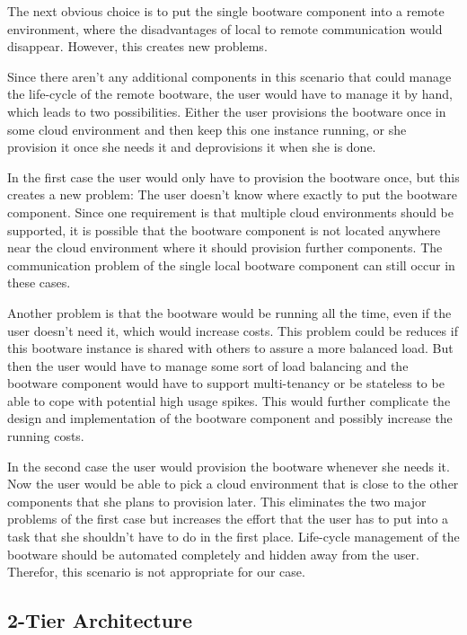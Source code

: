The next obvious choice is to put the single bootware component into a remote environment, where the disadvantages of local to remote communication would disappear.
However, this creates new problems.

Since there aren't any additional components in this scenario that could manage the life-cycle of the remote bootware, the user would have to manage it by hand, which leads to two possibilities.
Either the user provisions the bootware once in some cloud environment and then keep this one instance running, or she provision it once she needs it and deprovisions it when she is done.

In the first case the user would only have to provision the bootware once, but this creates a new problem: The user doesn't know where exactly to put the bootware component.
Since one requirement is that multiple cloud environments should be supported, it is possible that the bootware component is not located anywhere near the cloud environment where it should provision further components.
The communication problem of the single local bootware component can still occur in these cases.

Another problem is that the bootware would be running all the time, even if the user doesn't need it, which would increase costs.
This problem could be reduces if this bootware instance is shared with others to assure a more balanced load.
But then the user would have to manage some sort of load balancing and the bootware component would have to support multi-tenancy or be stateless to be able to cope with potential high usage spikes.
This would further complicate the design and implementation of the bootware component and possibly increase the running costs.

In the second case the user would provision the bootware whenever she needs it. Now the user would be able to pick a cloud environment that is close to the other components that she plans to provision later.
This eliminates the two major problems of the first case but increases the effort that the user has to put into a task that she shouldn't have to do in the first place.
Life-cycle management of the bootware should be automated completely and hidden away from the user.
Therefor, this scenario is not appropriate for our case.

\subsection{2-Tier Architecture}
\label{design:division:2tier}

